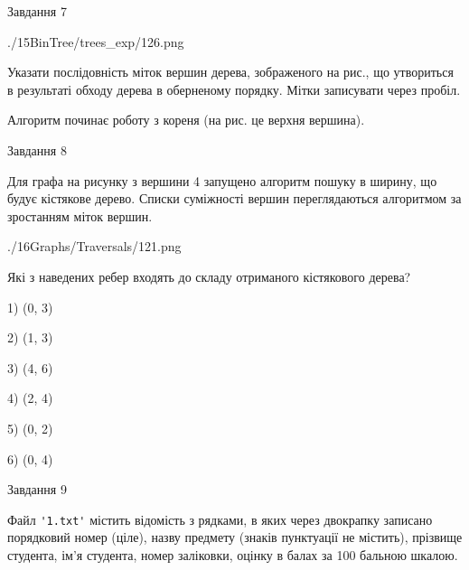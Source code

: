 \documentclass[12pt, ukrainian]{article}
\def\code#1{\Verb!#1!}
\begin{document}
{\vspace{10mm}\par

\newpage
\begin{minipage}[t]{9.7cm}
               
{\begin{center}Завдання {7}\end{center}}
\vspace{-6mm}

\begin{center}
	{./15BinTree/trees_exp/126.png}
\end{center}
Указати послідовність міток вершин дерева, зображеного на рис., що утвориться в результаті обходу дерева в оберненому порядку. Мітки записувати через пробіл.\par Алгоритм починає роботу з кореня (на рис. це верхня вершина).\par

\end{minipage}
\vline \hspace{8mm}
\begin{minipage}[t]{8.0cm}
               
{\begin{center}Завдання {8}\end{center}}
\vspace{-6mm}
Для графа на рисунку з вершини 4 запущено алгоритм пошуку в ширину, що будує кістякове дерево. Списки суміжності вершин переглядаються алгоритмом за зростанням міток вершин.\par
\begin{center}
	{./16Graphs/Traversals/121.png}
\end{center}
\par Які з наведених ребер входять до складу отриманого кістякового дерева?\par
1) (0, 3)\par
2) (1, 3)\par
3) (4, 6)\par
4) (2, 4)\par
5) (0, 2)\par
6) (0, 4)\par
{\vskip 15pt} \par

\end{minipage}

               
{\begin{center}Завдання {9}\end{center}}
\vspace{-6mm}
Файл \code{'1.txt'} містить відомість з рядками, в яких через двокрапку записано поряд\-ковий номер (ціле), назву предмету (знаків пунктуації не містить), прізвище студента, ім'я студента, номер заліковки, оцінку в балах за 100 бальною шкалою.

}
\end{document}
